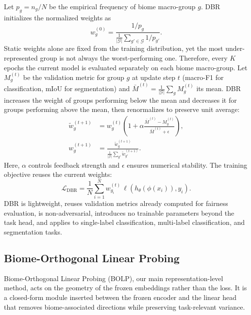\documentclass[10pt,twocolumn,letterpaper]{article}
\begin{document}
Let \(p_g = n_g / N\) be the empirical frequency of biome macro-group \(g\). DBR initializes the normalized weights as
\begin{equation}
w_g^{(0)}=\frac{1/p_g}{\frac{1}{|\mathcal{G}|}\sum_{g'\in\mathcal{G}}1/p_{g'}}\label{eq:wg}.
\end{equation}
\noindent Static weights alone are fixed from the training distribution, yet the most under-represented group is not always the worst-performing one. Therefore, every \(K\) epochs the current model is evaluated separately on each biome macro-group. Let \(M_g^{(t)}\) be the validation metric for group \(g\) at update step \(t\) (macro-F1 for classification, mIoU for segmentation) and \(\bar{M}^{(t)}=\frac{1}{|\mathcal{G}|}\sum_g M_g^{(t)}\) its mean. DBR increases the weight of groups performing below the mean and decreases it for groups performing above the mean, then renormalizes to preserve unit average:
\begin{align}
\tilde{w}^{(t+1)}_g &= w^{(t)}_g \left(1 + \alpha \frac{\bar{M}^{(t)} - M_g^{(t)}}{\bar{M}^{(t)} + \epsilon}\right), \\
w^{(t+1)}_g &= \frac{\tilde{w}^{(t+1)}_g}{\frac{1}{|\mathcal{G}|}\sum_{g'} \tilde{w}^{(t+1)}_{g'}}.
\end{align}
Here, \(\alpha\) controls feedback strength and \(\epsilon\) ensures numerical stability. The training objective reuses the current weights:
\begin{equation}
\mathcal{L}_{\mathrm{DBR}} = \frac{1}{N} \sum_{i=1}^N w^{(t)}_{g_i} \, \ell(h_\theta(\phi(x_i)), y_i).
\end{equation}
 DBR is lightweight, reuses validation metrics already computed for fairness evaluation, is non-adversarial, introduces no trainable parameters beyond the task head, and applies to single-label classification, multi-label classification, and segmentation tasks.

\subsection{Biome-Orthogonal Linear Probing}
Biome-Orthogonal Linear Probing (BOLP), our main representation-level method, acts on the geometry of the frozen embeddings rather than the loss. It is a closed-form module inserted between the frozen encoder and the linear head that removes biome-associated directions while preserving task-relevant variance.
\end{document}
